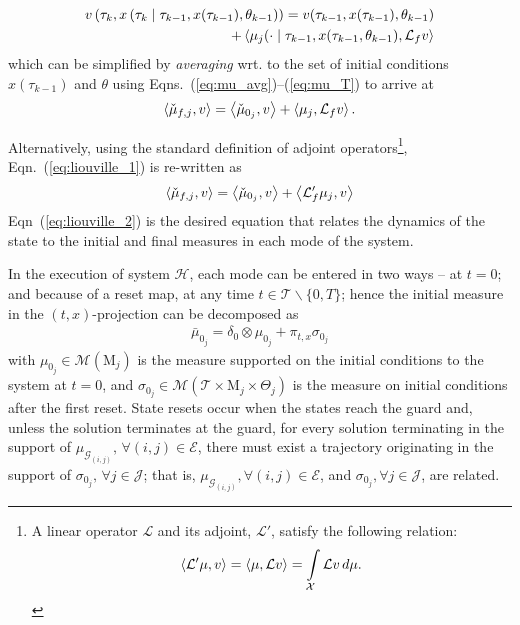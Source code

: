 \small
\begin{align}
\begin{split}
    v\left(\tau_k,x\left(\tau_{k}\mid \tau_{k-1},x(\tau_{k-1}),\theta_{k-1}\right)\right)=v(\tau_{k-1},x(\tau_{k-1}),\theta_{k-1})\\
    +\left\langle \mu_j(\cdot\mid \tau_{k-1},x(\tau_{k-1},\theta_{k-1}),\mathcal L_{ f}v\right\rangle
\end{split}
\end{align}
\normalsize
which can be simplified by \emph{averaging} wrt. to the set of initial conditions $x(\tau_{k-1})$ and $\theta$ using Eqns.~(\ref{eq:mu_avg})--(\ref{eq:mu_T}) to arrive at
\begin{align}
  \left\langle \check\mu_{f,j},v\right\rangle=\left\langle \check\mu_{0_j},v\right\rangle+\left\langle \mu_{j},\mathcal L_{f}v\right\rangle.
  \label{eq:liouville_1}
\end{align}
\par
Alternatively, using the standard definition of adjoint operators\footnote{A linear operator $\mathcal L$ and its adjoint, $\mathcal L'$, satisfy the following relation:
\begin{align*}
    \left\langle \mathcal L'\mu,v\right\rangle=\left\langle \mu,\mathcal Lv\right\rangle=\int\limits_{\mathcal X}\mathcal Lv\,d\mu.
\end{align*}}, Eqn.~(\ref{eq:liouville_1}) is re-written as
\begin{align}
\left\langle \check\mu_{f,j},v\right\rangle=\left\langle \check\mu_{0_j},v\right\rangle+\left\langle \mathcal L'_{f}\mu_{j},v\right\rangle
  \label{eq:liouville_2}
\end{align}
Eqn~(\ref{eq:liouville_2}) is the desired equation that relates the dynamics of the state to the initial and final measures in each mode of the system.
\par
In the execution of system $\mathcal H$, each mode can be entered in two ways -- at $t=0$; and because of a reset map, at any time $t\in \mathcal T\backslash\{0,T\}$; hence the initial measure in the $(t,x)$-projection can be decomposed as
\begin{align}
  \bar\mu_{0_j}=\delta_0\otimes\mu_{0_j}+\pi_{t,x}\sigma_{0_j}
\end{align}
with $\mu_{0_j}\in \mathcal M(\mathrm M_j)$ is the measure supported on the initial conditions to the system at $t=0$, and $\sigma_{0_j}\in \mathcal M(\mathcal T\times \mathrm M_j\times \Theta_j)$ is the measure on initial conditions after the first reset. State resets occur when the states reach the guard and, unless the solution terminates at the guard, for every solution terminating in the support of $\mu_{\mathcal G_{(i,j)}},\,\forall (i,j)\in \mathcal E$, there must exist a trajectory originating in the support of $\sigma_{0_j},\,\forall j\in \mathcal J$; that is, $\mu_{\mathcal G_{(i,j)}},\forall (i,j)\in \mathcal E$, and $\sigma_{0_j},\forall j\in \mathcal J$, are related.
